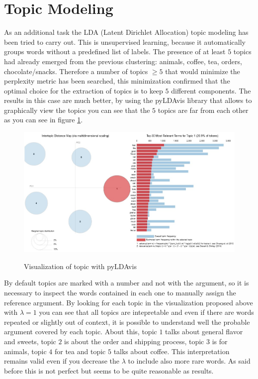 \documentclass[11pt]{article}
\begin{document}
\section{Topic Modeling}
As an additional task the LDA (Latent Dirichlet Allocation) topic modeling has been tried to carry out. This is unsupervised learning, because it automatically groups words without a predefined list of labels.
The presence of at least $5$ topics had already emerged from the previous clustering: animals, coffee, tea, orders, chocolate/snacks. Therefore a number of topics  $\geq 5$ that would minimize the perplexity metric has been searched, this minimization confirmed that the optimal choice for the extraction of topics is to keep $5$ different components. The results in this case are much better, by using the pyLDAvis library that allows to graphically view the topics you can see that the $5$ topics are far from each other as you can see in figure \ref{top_mod_pyLDAvis}.
\begin{figure}[H]
\begin{center}
  \includegraphics[scale = 0.5]{img/LDA.jpg}\\
  \caption{Visualization of topic with pyLDAvis}
  \label{top_mod_pyLDAvis}
\end{center}
\end{figure}
\noindent By default topics are marked with a number and not with the argument, so it is necessary to inspect the words contained in each one to manually assign the reference argument. By looking for each topic in the visualization proposed above with $\lambda = 1$ you can see that all topics are intepretable and even if there are words repeated or slightly out of context, it is possible to understand well the probable argument covered by each topic. About this, topic $1$ talks about general flavor and sweets, topic $2$ is about the order and shipping process, topic $3$ is for animals, topic $4$ for tea and topic $5$ talks about coffee. This interpretation remains valid even if you decrease the $\lambda$ to include also more rare words. As said before this is not perfect but seems to be quite reasonable as results.
\end{document}
